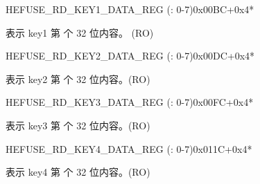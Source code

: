 \begin{register}{H}{EFUSE\_RD\_KEY1\_DATA\_REG (: 0-7)}{0x00BC+0x4*}\label{regdesc:EFUSERDKEY1DATANREG}
%
\regnewline%
\begin{regdesc}\begin{reglist}
\label{fielddesc:EFUSEKEY1DATAN}\item [EFUSE\_KEY1\_DATA\regindex{n}] 表示 key1 第  个 32 位内容。 (RO)
\end{reglist}\end{regdesc}
\end{register}


\begin{register}{H}{EFUSE\_RD\_KEY2\_DATA\_REG (: 0-7)}{0x00DC+0x4*}\label{regdesc:EFUSERDKEY2DATANREG}
%
\regnewline%
\begin{regdesc}\begin{reglist}
\label{fielddesc:EFUSEKEY2DATAN}\item [EFUSE\_KEY2\_DATA\regindex{n}] 表示 key2 第  个 32 位内容。(RO)
\end{reglist}\end{regdesc}
\end{register}


\begin{register}{H}{EFUSE\_RD\_KEY3\_DATA\_REG (: 0-7)}{0x00FC+0x4*}\label{regdesc:EFUSERDKEY3DATANREG}
%
\regnewline%
\begin{regdesc}\begin{reglist}
\label{fielddesc:EFUSEKEY3DATAN}\item [EFUSE\_KEY3\_DATA\regindex{n}] 表示 key3 第  个 32 位内容。(RO)
\end{reglist}\end{regdesc}
\end{register}


\begin{register}{H}{EFUSE\_RD\_KEY4\_DATA\_REG (: 0-7)}{0x011C+0x4*}\label{regdesc:EFUSERDKEY4DATANREG}
%
\regnewline%
\begin{regdesc}\begin{reglist}
\label{fielddesc:EFUSEKEY4DATAN}\item [EFUSE\_KEY4\_DATA\regindex{n}] 表示 key4 第  个 32 位内容。(RO)
\end{reglist}\end{regdesc}
\end{register}


